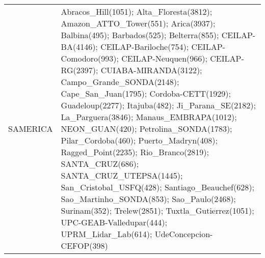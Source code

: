 \documentclass[journal abbreviation, manuscript]{copernicus}
\begin{document}
\begin{table}
\begin{tabularx}{\textwidth}{lX}
  SAMERICA &                                                                                                                                                                                                                                                                                                                                                                                                                                                                                                                                                                                                                                                                                                                                                                                                                                                                                                                                                                                                                                                                                                                                                                                                                                                                                                                                                                                                                                                    Abracos\_Hill(1051); Alta\_Floresta(3812); Amazon\_ATTO\_Tower(551); Arica(3937); Balbina(495); Barbados(525); Belterra(855); CEILAP-BA(4146); CEILAP-Bariloche(754); CEILAP-Comodoro(993); CEILAP-Neuquen(966); CEILAP-RG(2397); CUIABA-MIRANDA(3122); Campo\_Grande\_SONDA(2148); Cape\_San\_Juan(1795); Cordoba-CETT(1929); Guadeloup(2277); Itajuba(482); Ji\_Parana\_SE(2182); La\_Parguera(3846); Manaus\_EMBRAPA(1012); NEON\_GUAN(420); Petrolina\_SONDA(1783); Pilar\_Cordoba(460); Puerto\_Madryn(408); Ragged\_Point(2235); Rio\_Branco(2819); SANTA\_CRUZ(686); SANTA\_CRUZ\_UTEPSA(1445); San\_Cristobal\_USFQ(428); Santiago\_Beauchef(628); Sao\_Martinho\_SONDA(853); Sao\_Paulo(2468); Surinam(352); Trelew(2851); Tuxtla\_Gutierrez(1051); UPC-GEAB-Valledupar(444); UPRM\_Lidar\_Lab(614); UdeConcepcion-CEFOP(398) \\

\end{tabularx}
\end{table}
\end{document}
